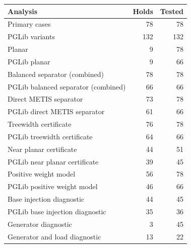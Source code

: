\begin{tabular}{lrr}
\hline
Analysis & Holds & Tested \\
\hline
Primary cases & 78 & 78 \\
PGLib variants & 132 & 132 \\
Planar & 9 & 78 \\
PGLib planar & 9 & 66 \\
Balanced separator (combined) & 78 & 78 \\
PGLib balanced separator (combined) & 66 & 66 \\
Direct METIS separator & 73 & 78 \\
PGLib direct METIS separator & 61 & 66 \\
Treewidth certificate & 76 & 78 \\
PGLib treewidth certificate & 64 & 66 \\
Near planar certificate & 44 & 51 \\
PGLib near planar certificate & 39 & 45 \\
Positive weight model & 56 & 78 \\
PGLib positive weight model & 46 & 66 \\
Base injection diagnostic & 44 & 45 \\
PGLib base injection diagnostic & 35 & 36 \\
Generator diagnostic & 3 & 45 \\
Generator and load diagnostic & 13 & 22 \\
\hline
\end{tabular}
